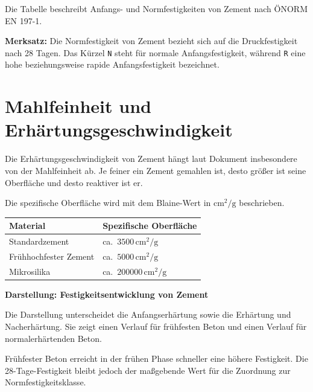 \documentclass[
  12pt,
  a4paper,
  oneside
]{scrreprt}
\begin{document}
Die Tabelle beschreibt Anfangs- und Normfestigkeiten von Zement nach
ÖNORM EN 197-1. 

\begin{merksatzbox}
\textbf{Merksatz:}
Die Normfestigkeit von Zement bezieht sich auf die Druckfestigkeit nach
28 Tagen. Das Kürzel \texttt{N} steht für normale Anfangsfestigkeit,
während \texttt{R} eine hohe beziehungsweise rapide Anfangsfestigkeit
bezeichnet. 
\end{merksatzbox}

\section{Mahlfeinheit und Erhärtungsgeschwindigkeit}

Die Erhärtungsgeschwindigkeit von Zement hängt laut Dokument
insbesondere von der Mahlfeinheit ab. Je feiner ein Zement gemahlen
ist, desto größer ist seine Oberfläche und desto reaktiver ist er.


Die spezifische Oberfläche wird mit dem Blaine-Wert in
$\mathrm{cm^2/g}$ beschrieben.

\begin{longtable}{
  >{\raggedright\arraybackslash}p{}
  >{\centering\arraybackslash}p{}
}
\toprule
\textbf{Material} &
\textbf{Spezifische Oberfläche} \\
\midrule
\endhead

Standardzement &
ca.\ $3500\,\mathrm{cm^2/g}$ \\

Frühhochfester Zement &
ca.\ $5000\,\mathrm{cm^2/g}$ \\

Mikrosilika &
ca.\ $200000\,\mathrm{cm^2/g}$ \\

\bottomrule
\end{longtable}



\begin{darstellungsbox}
\textbf{Darstellung: Festigkeitsentwicklung von Zement}

Die Darstellung unterscheidet die Anfangserhärtung sowie die Erhärtung
und Nacherhärtung. Sie zeigt einen Verlauf für frühfesten Beton und
einen Verlauf für normalerhärtenden Beton.

Frühfester Beton erreicht in der frühen Phase schneller eine höhere
Festigkeit. Die 28-Tage-Festigkeit bleibt jedoch der maßgebende Wert
für die Zuordnung zur Normfestigkeitsklasse.
\end{darstellungsbox}
\end{document}
